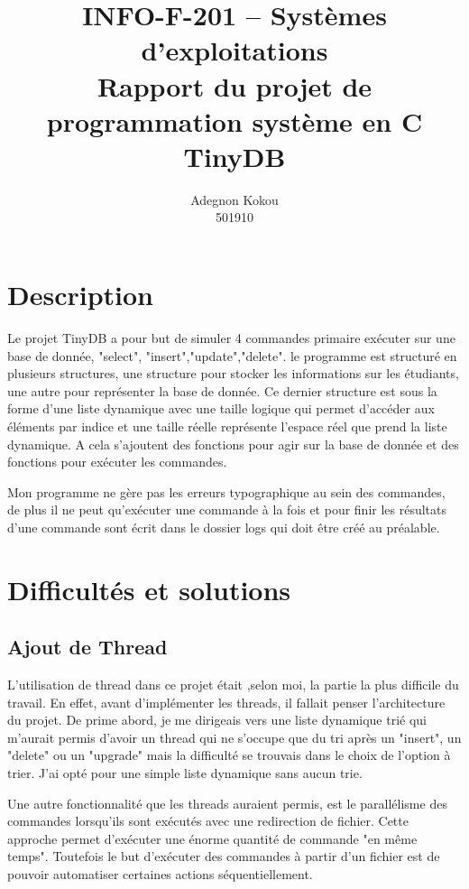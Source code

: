 \documentclass[a4paper, 12pt]{article}
\begin{document}
\tableofcontents

\title{INFO-F-201 – Systèmes d’exploitations\\Rapport du projet de programmation système en C\\TinyDB}
\author{Adegnon Kokou\\501910}
\maketitle{}
\section{Description}

Le projet TinyDB a pour but de simuler 4 commandes primaire exécuter sur une base de donnée, "select", "insert","update","delete".
le programme est structuré en plusieurs structures, une structure pour stocker les informations sur les étudiants, une autre pour représenter la base de donnée.
Ce dernier structure est sous la forme d'une liste dynamique avec une taille logique qui permet d’accéder aux éléments par indice et une taille réelle représente l'espace réel
que prend la liste dynamique. A cela s'ajoutent des fonctions pour agir sur la base de donnée et des fonctions pour exécuter les commandes.

Mon programme ne gère pas les erreurs typographique au sein des commandes, de plus il ne peut qu’exécuter une commande à la fois et pour finir les résultats d'une commande sont écrit 
dans le dossier logs qui doit être créé au préalable.

\section{Difficultés et solutions}

	\subsection{Ajout de Thread}
L'utilisation de thread dans ce projet était ,selon moi, la partie la plus difficile
du travail. En effet, avant d’implémenter les threads, il fallait penser 
l'architecture du projet. De prime abord, je me dirigeais vers une liste dynamique trié qui m'aurait permis d'avoir un thread qui
ne s'occupe que du tri après un "insert", un "delete" ou un "upgrade" mais la difficulté se trouvais dans le choix de l'option à trier.
J'ai opté pour une simple liste dynamique sans aucun trie.

Une autre fonctionnalité que les threads auraient permis, est le parallélisme des commandes lorsqu'ils sont exécutés avec une redirection de fichier.
Cette approche permet d’exécuter une énorme quantité de commande "en même temps". Toutefois le but d’exécuter des commandes à partir d'un fichier est de pouvoir
automatiser certaines actions séquentiellement.
\end{document}

